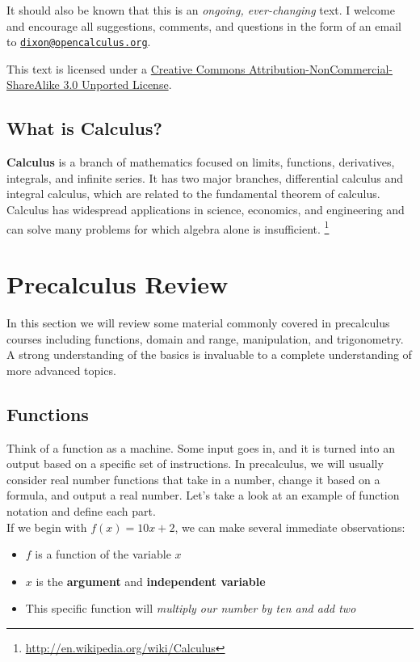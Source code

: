 \documentclass[oneside]{article}
\begin{document}
It should also be known that this is an \textit{ongoing, ever-changing} text. I welcome and encourage all suggestions, comments, and questions in the form of an email to \texttt{\href{mailto:dixon@opencalculus.org}{dixon@opencalculus.org}}. 

This text is licensed under a \href{http://creativecommons.org/licenses/by-nc-sa/3.0/deed.en_US}{Creative Commons Attribution-NonCommercial-ShareAlike 3.0 Unported License}.

\subsection{What is Calculus?}
\textbf{Calculus} is a branch of mathematics focused on limits, functions, derivatives, integrals, and infinite series. It has two major branches, differential calculus and integral calculus, which are related to the fundamental theorem of calculus. Calculus has widespread applications in science, economics, and engineering and can solve many problems for which algebra alone is insufficient. \footnote{\url{http://en.wikipedia.org/wiki/Calculus}}

\section{Precalculus Review}
In this section we will review some material commonly covered in precalculus courses including functions, domain and range, manipulation, and trigonometry. A strong understanding of the basics is invaluable to a complete understanding of more advanced topics.

\subsection{Functions}
Think of a function as a machine. Some input goes in, and it is turned into an output based on a specific set of instructions. In precalculus, we will usually consider real number functions that take in a number, change it based on a formula, and output a real number. Let's take a look at an example of function notation and define each part. \\

If we begin with $f(x) = 10x + 2$, we can make several immediate observations: 
\begin{itemize}
  \item $f$ is a function of the variable $x$
	\item $x$ is the \textbf{argument} and \textbf{independent variable}
	\item This specific function will \textit{multiply our number by ten and add two}
\end{itemize}
\end{document}
